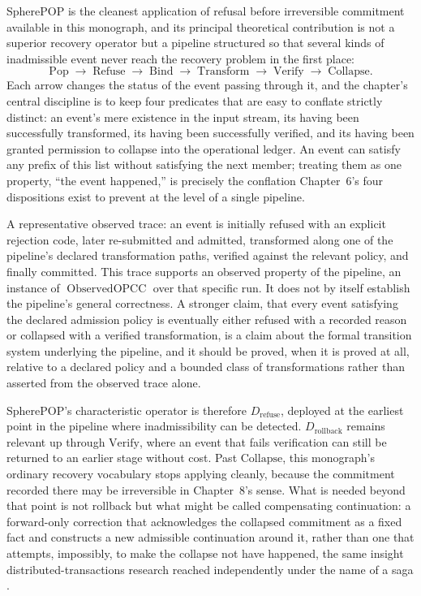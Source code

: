 \documentclass[11pt]{report}
\newcommand{\Refuse}{\mathrm{Refuse}}
\newcommand{\Pop}{\mathrm{Pop}}
\newcommand{\Bind}{\mathrm{Bind}}
\newcommand{\Transform}{\mathrm{Transform}}
\newcommand{\Verify}{\mathrm{Verify}}
\newcommand{\Collapse}{\mathrm{Collapse}}
\begin{document}
SpherePOP is the cleanest application of refusal before irreversible commitment available in this monograph, and its principal theoretical contribution is not a superior recovery operator but a pipeline structured so that several kinds of inadmissible event never reach the recovery problem in the first place:
\[
\Pop \;\longrightarrow\; \Refuse \;\longrightarrow\; \Bind \;\longrightarrow\; \Transform \;\longrightarrow\; \Verify \;\longrightarrow\; \Collapse.
\]
Each arrow changes the status of the event passing through it, and the chapter's central discipline is to keep four predicates that are easy to conflate strictly distinct: an event's mere existence in the input stream, its having been successfully transformed, its having been successfully verified, and its having been granted permission to collapse into the operational ledger. An event can satisfy any prefix of this list without satisfying the next member; treating them as one property, ``the event happened,'' is precisely the conflation Chapter~6's four dispositions exist to prevent at the level of a single pipeline.

A representative observed trace: an event is initially refused with an explicit rejection code, later re-submitted and admitted, transformed along one of the pipeline's declared transformation paths, verified against the relevant policy, and finally committed. This trace supports an observed property of the pipeline, an instance of $\operatorname{ObservedOPCC}$ over that specific run. It does not by itself establish the pipeline's general correctness. A stronger claim, that every event satisfying the declared admission policy is eventually either refused with a recorded reason or collapsed with a verified transformation, is a claim about the formal transition system underlying the pipeline, and it should be proved, when it is proved at all, relative to a declared policy and a bounded class of transformations rather than asserted from the observed trace alone.

SpherePOP's characteristic operator is therefore $D_{\mathrm{refuse}}$, deployed at the earliest point in the pipeline where inadmissibility can be detected. $D_{\mathrm{rollback}}$ remains relevant up through $\Verify$, where an event that fails verification can still be returned to an earlier stage without cost. Past $\Collapse$, this monograph's ordinary recovery vocabulary stops applying cleanly, because the commitment recorded there may be irreversible in Chapter~8's sense. What is needed beyond that point is not rollback but what might be called compensating continuation: a forward-only correction that acknowledges the collapsed commitment as a fixed fact and constructs a new admissible continuation around it, rather than one that attempts, impossibly, to make the collapse not have happened, the same insight distributed-transactions research reached independently under the name of a saga \cite{garciamolina1987,helland2007}.
\end{document}
